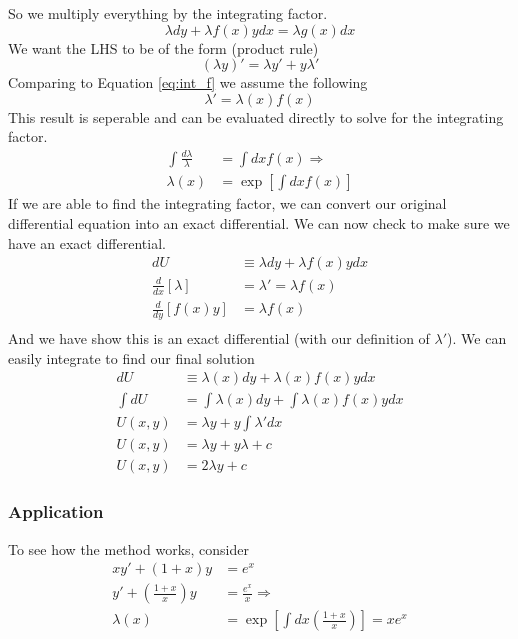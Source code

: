 \documentclass{article}
\newcommand{\be}{\begin{equation}}
\newcommand{\ee}{\end{equation}}
\begin{document}
So we multiply everything by the integrating factor.
\be \label{eq:int_f}
\lambda dy + \lambda f(x) y dx = \lambda g(x) dx
\ee
We want the LHS to be of the form (product rule)
\be
(\lambda y)' = \lambda y' + y\lambda'
\ee
Comparing to Equation \ref{eq:int_f} we assume the following
\be
\lambda' = \lambda(x) f(x)
\ee
This result is seperable and can be evaluated directly to solve for the integrating factor. 
\be
\begin{split}
    \int \frac{d\lambda}{\lambda} &= \int dx f(x) \Rightarrow\\
    \lambda(x) &= \exp\left[\int dx f(x)\right]
\end{split}
\ee
If we are able to find the integrating factor, we can convert our original differential equation into an exact differential.
We can now check to make sure we have an exact differential.
\be
\begin{split}
    dU &\equiv \lambda dy + \lambda f(x)ydx\\
    \frac{d}{dx}\left[\lambda\right] &= \lambda' = \lambda f(x)\\
    \frac{d}{dy} \left[f(x)y\right] &= \lambda f(x)\\
\end{split}
\ee
And we have show this is an exact differential (with our definition of $\lambda'$). 
We can easily integrate to find our final solution
\be
\begin{split}
    dU &\equiv \lambda(x) dy + \lambda(x) f(x)ydx\\
    \int dU &= \int \lambda(x) dy + \int \lambda(x) f(x)ydx\\
    U(x,y) &= \lambda y + y\int \lambda' dx\\
    U(x,y) &= \lambda y + y \lambda + c\\
    U(x,y) &= 2\lambda y + c
\end{split}
\ee

\subsubsection*{Application}
To see how the method works, consider
\be \label{eq:if_ex}
\begin{split}
    xy' + (1+x) y &= e^x\\
    y' + \left(\frac{1+x}{x}\right)y &= \frac{e^x}{x} \Rightarrow \\
    \lambda(x) &= \exp\left[ \int dx \left(\frac{1+x}{x}\right) \right] = xe^x
\end{split}
\ee
\end{document}

